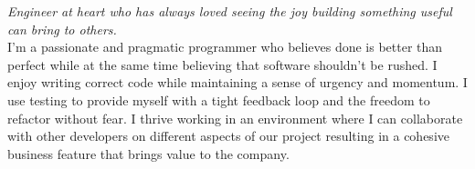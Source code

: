 \vspace{-1.3em}  %
\begin{multicols}{2}  %
\noindent \emph{Engineer at heart who has always loved 
seeing the joy building something useful can bring to
others.}
\\

I'm a passionate and pragmatic programmer who believes done is better than 
perfect while at the same time believing that software shouldn't be rushed. 
I enjoy writing correct code while maintaining a sense of urgency and momentum. 
I use testing to provide myself with a tight feedback loop and the freedom to 
refactor without fear. I thrive working in an environment where I can  
collaborate with other developers on different aspects of our project resulting
in a cohesive business feature that brings value to the company.

\end{multicols}


\spacedhrule{0em}{-0.4em}


